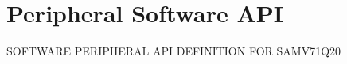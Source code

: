 \hypertarget{group__SAMV71Q20__api}{}\section{Peripheral Software A\+PI}
\label{group__SAMV71Q20__api}
S\+O\+F\+T\+W\+A\+RE P\+E\+R\+I\+P\+H\+E\+R\+AL A\+PI D\+E\+F\+I\+N\+I\+T\+I\+ON F\+OR S\+A\+M\+V71\+Q20 